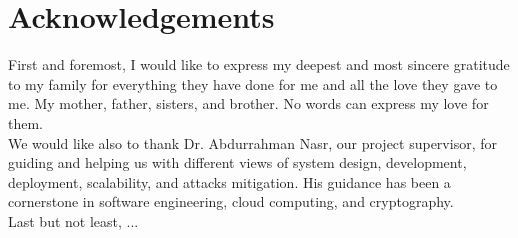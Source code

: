 \chapter*{Acknowledgements}

First and foremost, I would like to express my deepest and most sincere gratitude to my family for everything they have done for me and all the love they gave to me. My mother, father, sisters, and brother. No words can express my love for them.\\[16pt]

\noindent
We would like also to thank Dr. Abdurrahman Nasr, our project supervisor, for guiding and helping us with different views of system design, development, deployment, scalability, and attacks mitigation. His guidance has been a cornerstone in software engineering, cloud computing, and cryptography. \\[16pt]

\noindent
Last but not least, ...
